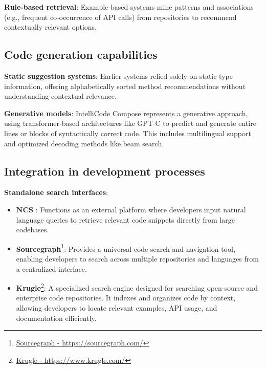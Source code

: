 \textbf{Rule-based retrieval}: Example-based systems mine patterns and associations (e.g., frequent co-occurrence of API calls) from repositories to recommend contextually relevant options.

\subsection{Code generation capabilities}
\textbf{Static suggestion systems}: Earlier systems \cite{bruch2009} relied solely on static type information, offering alphabetically sorted method recommendations without understanding contextual relevance.

\textbf{Generative models}: IntelliCode Compose represents a generative approach, using transformer-based architectures \cite{vaswani2017} like GPT-C to predict and generate entire lines or blocks of syntactically correct code. This includes multilingual support and optimized decoding methods like beam search.

\subsection{Integration in development processes}
\textbf{Standalone search interfaces}:
    \begin{itemize}
        \item \textbf{NCS} \cite{sachdev2018}: Functions as an external platform where developers input natural language queries to retrieve relevant code snippets directly from large codebases.
        \item \textbf{Sourcegraph}\footnote{\href{https://sourcegraph.com/}{Sourcegraph - https://sourcegraph.com/}}: Provides a universal code search and navigation tool, enabling developers to search across multiple repositories and languages from a centralized interface.
        \item \textbf{Krugle}\footnote{\href{https://www.krugle.com/}{Krugle - https://www.krugle.com/}}: A specialized search engine designed for searching open-source and enterprise code repositories. It indexes and organizes code by context, allowing developers to locate relevant examples, API usage, and documentation efficiently.
    \end{itemize}

